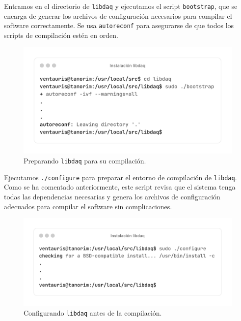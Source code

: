 \documentclass[11pt,a4paper,twoside]{report}
\begin{document}
Entramos en el directorio de \texttt{libdaq} y ejecutamos el script \texttt{bootstrap}, que se encarga de generar los archivos de configuración necesarios para compilar el software correctamente. Se usa \texttt{autoreconf} para asegurarse de que todos los scripts de compilación estén en orden.

\begin{figure}[H]
	\centering
	\includegraphics[scale=0.12]{instalacion_snort/10-10.png}
	\caption{Preparando \texttt{libdaq} para su compilación.}
\end{figure}

\newpage


Ejecutamos \texttt{./configure} para preparar el entorno de compilación de \texttt{libdaq}. Como se ha comentado anteriormente, este script revisa que el sistema tenga todas las dependencias necesarias y genera los archivos de configuración adecuados para compilar el software sin complicaciones.

\begin{figure}[H]
	\centering
	\includegraphics[scale=0.12]{instalacion_snort/11-11.png}
	\caption{Configurando \texttt{libdaq} antes de la compilación.}
\end{figure}
\end{document}

